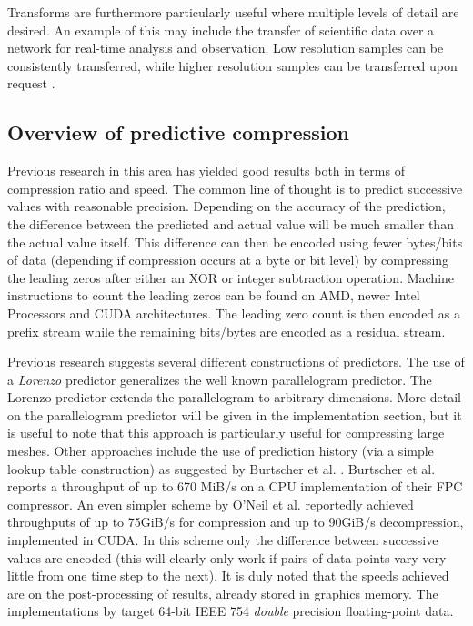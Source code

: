 Transforms are furthermore particularly useful where multiple levels of detail are desired. An example of this may include the transfer of scientific data over a network 
for real-time analysis and observation. Low resolution samples can be consistently transferred, while higher resolution samples can be transferred upon request \cite{Tao:1994:PTS:951087.951108}.
\subsection{Overview of predictive compression}
Previous research \cite{1607248,4589203,engelson2000lossless,lindstrom2006fast,O'Neil:2011:FDC:1964179.1964189,4976448,CGF:CGF681} in this area has yielded good results both in terms of compression ratio and speed. 
The common line of thought is to predict successive values with reasonable precision. Depending on the accuracy of the prediction, the difference between the predicted and actual value will be much smaller than the actual value itself. 
This difference can then be encoded using fewer bytes/bits of data (depending if compression occurs at a byte or bit level) by compressing the leading zeros after either an XOR or integer subtraction 
operation. Machine instructions to count the leading zeros can be found on AMD, newer Intel Processors and CUDA architectures. The leading zero count is then encoded as a prefix stream while the remaining bits/bytes 
are encoded as a residual stream.

Previous research suggests several different constructions of predictors. The use of a \textit{Lorenzo} predictor \cite{lindstrom2006fast,CGF:CGF681} generalizes the well known parallelogram predictor. 
The Lorenzo predictor extends the parallelogram to arbitrary dimensions. More detail on the parallelogram predictor will be given
in the implementation section, but it is useful to note that this approach is particularly useful for compressing large meshes. Other approaches include the use of prediction history 
(via a simple lookup table construction) as suggested by Burtscher et al. \cite{1607248,4589203,4976448}. Burtscher et al. reports a throughput of up to 670 MiB/s on a CPU implementation of their FPC 
compressor. An even simpler scheme by O'Neil et al. \cite{O'Neil:2011:FDC:1964179.1964189} reportedly achieved throughputs of up to 75GiB/s for compression and up to 90GiB/s 
decompression, implemented in CUDA. In this scheme only the difference between successive values are encoded (this will clearly only work if pairs of data points 
vary very little from one time step to the next). It is duly noted that the speeds achieved  are on the post-processing of results, already stored in graphics memory. 
The implementations by \cite{O'Neil:2011:FDC:1964179.1964189,1607248,4589203,4976448,engelson2000lossless} target 64-bit IEEE 754 
\textit{double} precision floating-point data.

